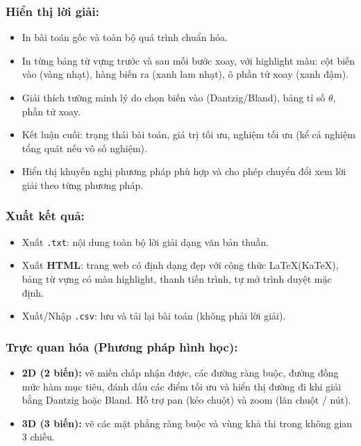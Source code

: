 \documentclass[12pt,a4paper]{article}
\begin{document}
\subsubsection*{Hiển thị lời giải:}
\begin{itemize}[label=\textcolor{secondary}{$\circ$}, itemsep=1pt]
    \item In bài toán gốc và toàn bộ quá trình chuẩn hóa. 
    \item In từng bảng từ vựng trước và sau mỗi bước xoay, với highlight màu: cột biến vào (vàng nhạt), hàng biến ra (xanh lam nhạt), ô phần tử xoay (xanh đậm).
    \item Giải thích tường minh lý do chọn biến vào (Dantzig/Bland), bảng tỉ số $\theta$, phần tử xoay. 
    \item Kết luận cuối: trạng thái bài toán, giá trị tối ưu, nghiệm tối ưu (kể cả nghiệm tổng quát nếu vô số nghiệm). 
    \item Hiển thị khuyến nghị phương pháp phù hợp và cho phép chuyển đổi xem lời giải theo từng phương pháp. 
\end{itemize}

\subsubsection*{Xuất kết quả:}
\begin{itemize}[label=\textcolor{secondary}{$\circ$}, itemsep=1pt]
    \item Xuất \texttt{.txt}: nội dung toàn bộ lời giải dạng văn bản thuần. 
    \item Xuất \textbf{HTML}: trang web có định dạng đẹp với công thức \LaTeX (KaTeX), bảng từ vựng có màu highlight, thanh tiến trình, tự mở trình duyệt mặc định. 
    \item Xuất/Nhập \texttt{.csv}: lưu và tải lại bài toán (không phải lời giải). 
\end{itemize}

\subsubsection*{Trực quan hóa (Phương pháp hình học):}
\begin{itemize}[label=\textcolor{secondary}{$\circ$}]
    \item \textbf{2D (2 biến):} vẽ miền chấp nhận được, các đường ràng buộc, đường đồng mức hàm mục tiêu, đánh dấu các điểm tối ưu và hiển thị đường đi khi giải bằng Dantzig hoặc Bland. Hỗ trợ pan (kéo chuột) và zoom (lăn chuột / nút). 
    \item \textbf{3D (3 biến):} vẽ các mặt phẳng ràng buộc và vùng khả thi trong không gian 3 chiều. 
\end{itemize}
\end{document}
